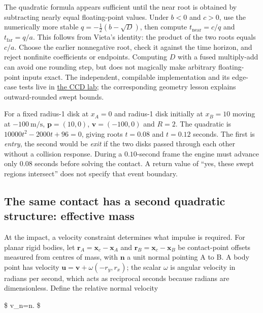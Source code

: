 The quadratic formula appears sufficient until the near root is obtained by subtracting nearly equal floating-point values. Under \(b<0\) and \(c>0\), use the numerically more stable \(q=-\tfrac12(b-\sqrt D)\), then compute \(t_{\mathrm{near}}=c/q\) and \(t_{\mathrm{far}}=q/a\). This follows from Vieta's identity: the product of the two roots equals \(c/a\). Choose the earlier nonnegative root, check it against the time horizon, and reject nonfinite coefficients or endpoints. Computing \(D\) with a fused multiply-add can avoid one rounding step, but does not magically make arbitrary floating-point inputs exact. The independent, compilable implementation and its edge-case tests live in \href{../../tools/labs/disk_ccd_lab.cpp}{the CCD lab}; the corresponding geometry lesson explains outward-rounded swept bounds.

For a fixed radius-1 disk at \(x_A=0\) and radius-1 disk initially at \(x_B=10\) moving at \(-100\ \mathrm{m/s}\), \(\mathbf p=(10,0)\), \(\mathbf v=(-100,0)\) and \(R=2\). The quadratic is \(10000t^2-2000t+96=0\), giving roots \(t=0.08\) and \(t=0.12\) seconds. The first is \emph{entry}, the second would be \emph{exit} if the two disks passed through each other without a collision response. During a \(0.10\)-second frame the engine must advance only \(0.08\) seconds before solving the contact. A return value of ``yes, these swept regions intersect'' does not specify that event boundary.

\subsection{The same contact has a second quadratic structure: effective mass}\label{01-foundations-i-ch018-the-same-contact-has-a-second-quadratic-structure-effective-mass}

At the impact, a velocity constraint determines what impulse is required. For planar rigid bodies, let \(\mathbf r_A=\mathbf x_c-\mathbf x_A\) and \(\mathbf r_B=\mathbf x_c-\mathbf x_B\) be contact-point offsets measured from centres of mass, with \(\mathbf n\) a unit normal pointing A to B. A body point has velocity \(\mathbf u=\mathbf v+\omega(-r_y,r_x)\); the scalar \(\omega\) is angular velocity in radians per second, which acts as reciprocal seconds because radians are dimensionless. Define the relative normal velocity

\$ v\_n=\mathbf n\cdot{}. \$

